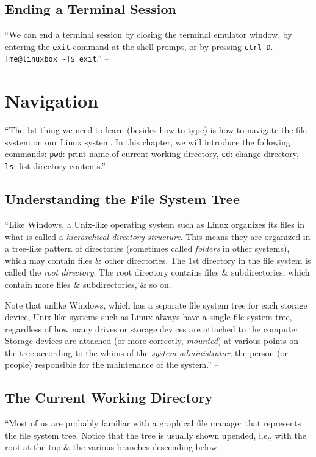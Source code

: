 \documentclass[oneside]{book}
\numberwithin{equation}{section}
\begin{document}
\subsection{Ending a Terminal Session}
``We can end a terminal session by closing the terminal emulator window, by entering the \texttt{exit} command at the shell prompt, or by pressing \texttt{ctrl-D}. \verb|[me@linuxbox ~]$ exit|.'' -- \cite[p. 42]{Shotts2019}


\section{Navigation}
``The 1st thing we need to learn (besides how to type) is how to navigate the file system on our Linux system. In this chapter, we will introduce the following commands: \texttt{pwd}: print name of current working directory, \texttt{cd}: change directory, \texttt{ls}: list directory contents.'' -- \cite[p. 43]{Shotts2019}

\subsection{Understanding the File System Tree}
``Like Windows, a Unix-like operating system such as Linux organizes its files in what is called a \textit{hierarchical directory structure}. This means they are organized in a tree-like pattern of directories (sometimes called \textit{folders} in other systems), which may contain files \& other directories. The 1st directory in the file system is called the \textit{root directory}. The root directory contains files \& subdirectories, which contain more files \& subdirectories, \& so on.

Note that unlike Windows, which has a separate file system tree for each storage device, Unix-like systems such as Linux always have a single file system tree, regardless of how many drives or storage devices are attached to the computer. Storage devices are attached (or more correctly, \textit{mounted}) at various points on the tree according to the whims of the \textit{system administrator}, the person (or people) responsible for the maintenance of the system.'' -- \cite[pp. 43--44]{Shotts2019}

\subsection{The Current Working Directory}
``Most of us are probably familiar with a graphical file manager that represents the file system tree. Notice that the tree is usually shown upended, i.e., with the root at the top \& the various branches descending below.
\end{document}
